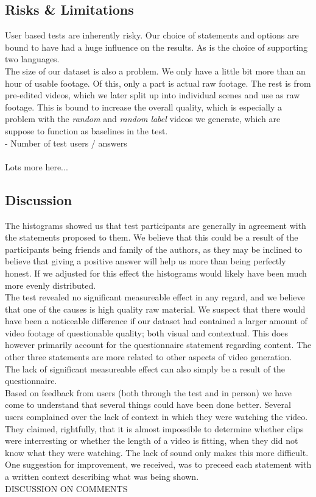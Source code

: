 \subsection{Risks \& Limitations}
%
User based tests are inherently risky. Our choice of statements and options are bound to have had a huge influence on the results. As is the choice of supporting two languages.\\
The size of our dataset is also a problem. We only have a little bit more than an hour of usable footage. Of this, only a part is actual raw footage. The rest is from pre-edited videos, which we later split up into individual scenes and use as raw footage. This is bound to increase the overall quality, which is especially a problem with the \textit{random} and \textit{random label} videos we generate, which are suppose to function as baselines in the test.\\
- Number of test users / answers
\\\\
%
Lots more here...
%
\subsection{Discussion}
%
The histograms showed us that test participants are generally in agreement with the statements proposed to them. We believe that this could be a result of the participants being friends and family of the authors, as they may be inclined to believe that giving a positive answer will help us more than being perfectly honest. If we adjusted for this effect the histograms would likely have been much more evenly distributed.\\
%
The test revealed no significant measureable effect in any regard, and we believe that one of the causes is high quality raw material. We suspect that there would have been a noticeable difference if our dataset had contained a larger amount of video footage of questionable quality; both visual and contextual. This does however primarily account for the questionnaire statement regarding content. The other three statements are more related to other aspects of video generation.\\
The lack of significant measureable effect can also simply be a result of the questionnaire.\\
Based on feedback from users (both through the test and in person) we have come to understand that several things could have been done better. Several users complained over the lack of context in which they were watching the video. They claimed, rightfully, that it is almost impossible to determine whether clips were interresting or whether the length of a video is fitting, when they did not know what they were watching. The lack of sound only makes this more difficult. One suggestion for improvement, we received, was to preceed each statement with a written context describing what was being shown.\\
DISCUSSION ON COMMENTS
%
